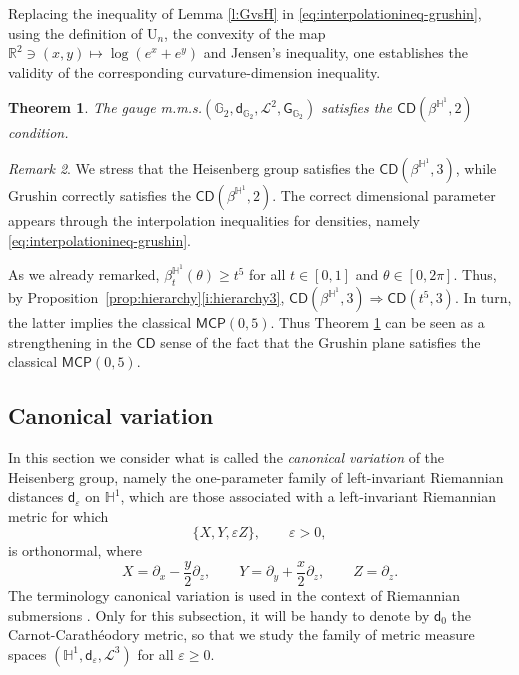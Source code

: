 \documentclass[11pt,a4paper]{article}
\theoremstyle{plain}
\newtheorem{theorem}{Theorem}[section]
\theoremstyle{definition}
\theoremstyle{remark}
\newtheorem{remark}[theorem]{Remark}
\numberwithin{equation}{section}
\newcommand{\R}{\mathbb{R}} %
\renewcommand{\H}{\mathbb{H}}
\newcommand{\CD}{\mathsf{CD}}
\newcommand{\MCP}{\mathsf{MCP}}
\newcommand{\U}{\mathrm{U}}
\newcommand{\sfd}{\mathsf d}
\newcommand{\sfG}{\mathsf G}
\begin{document}
Replacing the inequality of Lemma \ref{l:GvsH} in \eqref{eq:interpolationineq-grushin}, using the definition of $\U_n$, the convexity of the map $\R^{2}\ni(x,y)\mapsto \log(e^{x}+e^{y})$ and Jensen's inequality, one establishes the validity of the corresponding curvature-dimension inequality.
\begin{theorem}\label{t:GrushinCD}
The gauge m.m.s.\@ $(\mathbb{G}_2,\sfd_{\mathbb{G}_2},\mathscr{L}^2,\sfG_{\mathbb{G}_2})$ satisfies the $\CD(\beta^{\mathbb{H}^{1}},2)$ condition.
\end{theorem}
\begin{remark}
We stress that the Heisenberg group satisfies the $\CD(\beta^{\mathbb{H}^1},3)$, while Grushin correctly satisfies the $\CD(\beta^{\mathbb{H}^1},2)$. The correct dimensional parameter appears through the interpolation inequalities for densities, namely \eqref{eq:interpolationineq-grushin}.
\end{remark}

As we already remarked, $\beta^{\H^1}_t(\theta) \geq t^{5}$ for all $t\in [0,1]$ and $\theta \in [0,2\pi]$. Thus, by Proposition~\ref{prop:hierarchy}\ref{i:hierarchy3}, $\CD(\beta^{\H^1},3) \Rightarrow \CD(t^{5},3)$. In turn, the latter implies the classical $\MCP(0,5)$. Thus Theorem \ref{t:GrushinCD} can be seen as a strengthening in the $\CD$ sense of the fact that the Grushin plane satisfies the classical $\MCP(0,5)$.


\subsection{Canonical variation}\label{sec:ex:canvar}

 In this section we consider what is called the \emph{canonical variation} of the Heisenberg group, namely the one-parameter family of left-invariant Riemannian distances $\sfd_\varepsilon$ on $\H^1$, which are those associated with a left-invariant Riemannian metric for which
\begin{equation}
\{X,Y,\varepsilon Z\}, \qquad \varepsilon>0,
\end{equation}
is orthonormal, where
\begin{equation}
X = \partial_x -\frac{y}{2}\partial_z, \qquad Y =\partial_y + \frac{x}{2}\partial_z, \qquad Z=\partial_{z}.
\end{equation}
The terminology canonical variation is used in the context of Riemannian submersions \cite{Besse}. Only for this subsection, it will be handy to denote by $\sfd_0$ the Carnot-Carathéodory metric, so that we study the family of metric measure spaces $(\H^1,\sfd_\varepsilon,\mathscr{L}^3)$ for all $\varepsilon\geq 0$.
\end{document}

